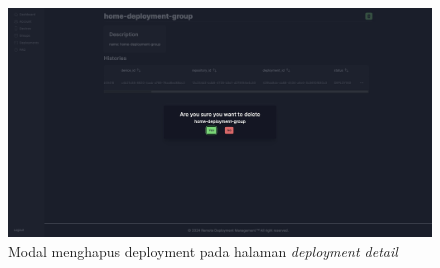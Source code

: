 \begin{figure}[ht]
  \centering
  \includegraphics[width=1\textwidth]{resources/chapter-4/dashboard/deployment-detail-delete.jpg}
  \caption{Modal menghapus deployment pada halaman \textit{deployment detail}}
  \label{fig:halaman-deployment-detail-delete}
\end{figure}